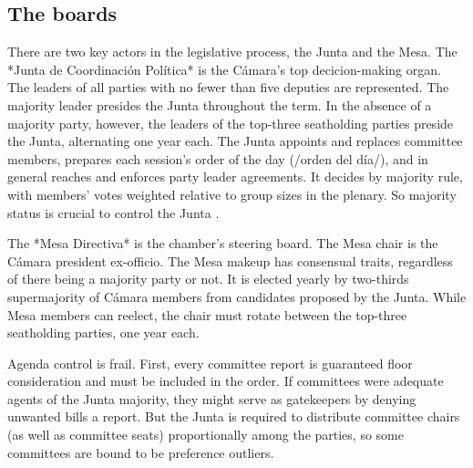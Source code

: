 \documentclass[letter,12pt]{article}
\begin{document}
  \subsection{The boards}
There are two key actors in the legislative process, the Junta and the Mesa. The *Junta de Coordinación Política* is the Cámara's top decicion-making organ. The leaders of all parties with no fewer than five deputies are represented. The majority leader presides the Junta throughout the term. In the absence of a majority party, however, the leaders of the top-three seatholding parties preside the Junta, alternating one year each. The Junta appoints and replaces committee members, prepares each session's order of the day (/orden del día/), and in general reaches and enforces party leader agreements. It decides by majority rule, with members' votes weighted relative to group sizes in the plenary. So majority status is crucial to control the Junta \citep[cf.][]{cox.mccubbins.2005}.

The *Mesa Directiva* is the chamber's steering board. The Mesa chair is the Cámara president ex-officio. The Mesa makeup has consensual traits, regardless of there being a majority party or not. It is elected yearly by two-thirds supermajority of Cámara members from candidates proposed by the Junta. While Mesa members can reelect, the chair must rotate between the top-three seatholding parties, one year each. 



Agenda control is frail. First, every committee report is guaranteed floor consideration and must be included in the order. If committees were adequate agents of the Junta majority, they might serve as gatekeepers by denying unwanted bills a report. But the Junta is required to distribute committee chairs (as well as committee seats) proportionally among the parties, so some committees are bound to be preference outliers.
\end{document}

